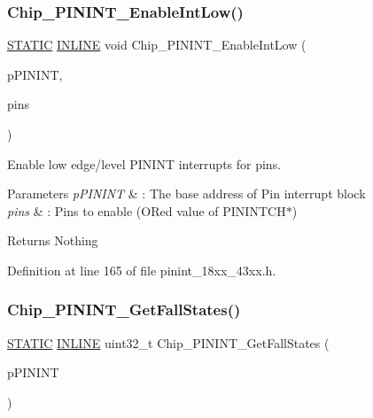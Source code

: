 \subsubsection{\texorpdfstring{Chip\+\_\+\+P\+I\+N\+I\+N\+T\+\_\+\+Enable\+Int\+Low()}{Chip\_PININT\_EnableIntLow()}}
{\footnotesize\ttfamily \hyperlink{group___l_p_c___types___public___macros_ga10b2d890d871e1489bb02b7e70d9bdfb}{S\+T\+A\+T\+IC} \hyperlink{spifi__18xx__43xx_8h_a2eb6f9e0395b47b8d5e3eeae4fe0c116}{I\+N\+L\+I\+NE} void Chip\+\_\+\+P\+I\+N\+I\+N\+T\+\_\+\+Enable\+Int\+Low (\begin{DoxyParamCaption}\item[{\hyperlink{struct_l_p_c___p_i_n___i_n_t___t}{L\+P\+C\+\_\+\+P\+I\+N\+\_\+\+I\+N\+T\+\_\+T} $\ast$}]{p\+P\+I\+N\+I\+NT,  }\item[{uint32\+\_\+t}]{pins }\end{DoxyParamCaption})}



Enable low edge/level P\+I\+N\+I\+NT interrupts for pins. 


\begin{DoxyParams}{Parameters}
{\em p\+P\+I\+N\+I\+NT} & \+: The base address of Pin interrupt block \\
\hline
{\em pins} & \+: Pins to enable (O\+Red value of P\+I\+N\+I\+N\+T\+C\+H$\ast$) \\
\hline
\end{DoxyParams}
\begin{DoxyReturn}{Returns}
Nothing 
\end{DoxyReturn}


Definition at line 165 of file pinint\+\_\+18xx\+\_\+43xx.\+h.

\mbox{\label{group___p_i_n_i_n_t__18_x_x__43_x_x_ga71d71a0537b91ed76457a8f65165c4ec}} 
\subsubsection{\texorpdfstring{Chip\+\_\+\+P\+I\+N\+I\+N\+T\+\_\+\+Get\+Fall\+States()}{Chip\_PININT\_GetFallStates()}}
{\footnotesize\ttfamily \hyperlink{group___l_p_c___types___public___macros_ga10b2d890d871e1489bb02b7e70d9bdfb}{S\+T\+A\+T\+IC} \hyperlink{spifi__18xx__43xx_8h_a2eb6f9e0395b47b8d5e3eeae4fe0c116}{I\+N\+L\+I\+NE} uint32\+\_\+t Chip\+\_\+\+P\+I\+N\+I\+N\+T\+\_\+\+Get\+Fall\+States (\begin{DoxyParamCaption}\item[{\hyperlink{struct_l_p_c___p_i_n___i_n_t___t}{L\+P\+C\+\_\+\+P\+I\+N\+\_\+\+I\+N\+T\+\_\+T} $\ast$}]{p\+P\+I\+N\+I\+NT }\end{DoxyParamCaption})}




